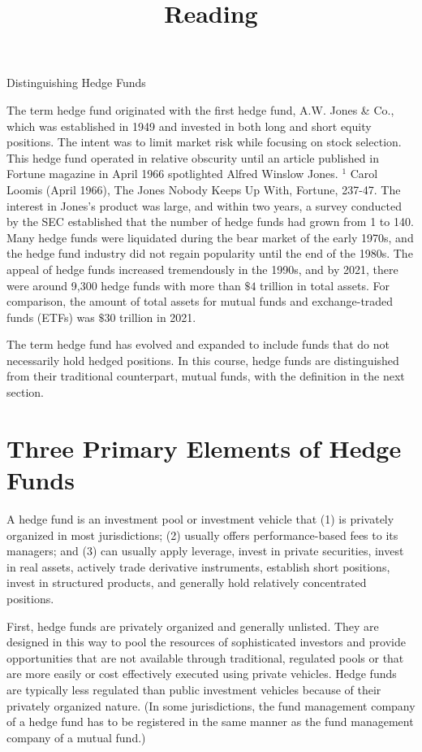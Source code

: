 \documentclass[11pt]{article}
\title{Reading }
\author{}
\date{}
\begin{document}
\maketitle
Distinguishing Hedge Funds

The term hedge fund originated with the first hedge fund, A.W. Jones \& Co., which was established in 1949 and invested in both long and short equity positions. The intent was to limit market risk while focusing on stock selection. This hedge fund operated in relative obscurity until an article published in Fortune magazine in April 1966 spotlighted Alfred Winslow Jones. ${ }^{1}$ Carol Loomis (April 1966), The Jones Nobody Keeps Up With, Fortune, 237-47. The interest in Jones's product was large, and within two years, a survey conducted by the SEC established that the number of hedge funds had grown from 1 to 140. Many hedge funds were liquidated during the bear market of the early 1970s, and the hedge fund industry did not regain popularity until the end of the 1980s. The appeal of hedge funds increased tremendously in the 1990s, and by 2021, there were around 9,300 hedge funds with more than $\$ 4$ trillion in total assets. For comparison, the amount of total assets for mutual funds and exchange-traded funds (ETFs) was $\$ 30$ trillion in 2021.

The term hedge fund has evolved and expanded to include funds that do not necessarily hold hedged positions. In this course, hedge funds are distinguished from their traditional counterpart, mutual funds, with the definition in the next section.

\section*{Three Primary Elements of Hedge Funds}
A hedge fund is an investment pool or investment vehicle that (1) is privately organized in most jurisdictions; (2) usually offers performance-based fees to its managers; and (3) can usually apply leverage, invest in private securities, invest in real assets, actively trade derivative instruments, establish short positions, invest in structured products, and generally hold relatively concentrated positions.

First, hedge funds are privately organized and generally unlisted. They are designed in this way to pool the resources of sophisticated investors and provide opportunities that are not available through traditional, regulated pools or that are more easily or cost effectively executed using private vehicles. Hedge funds are typically less regulated than public investment vehicles because of their privately organized nature. (In some jurisdictions, the fund management company of a hedge fund has to be registered in the same manner as the fund management company of a mutual fund.)
\end{document}
